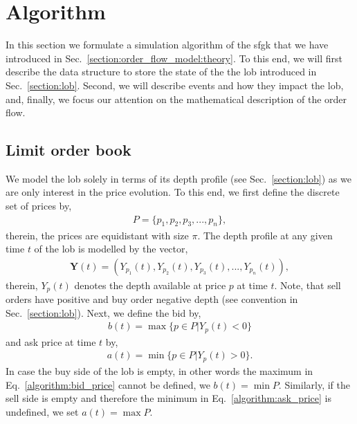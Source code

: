 \documentclass[11pt, a4paper]{thesis}  %
\begin{document}

\section{Algorithm}
\label{section:order_flow_model:algorithm}

In this section we formulate a simulation algorithm of the \ac{sfgk} that we have introduced in Sec.~\ref{section:order_flow_model:theory}. To this end, we will first describe the data structure to store the state of the the \ac{lob} introduced in Sec.~\ref{section:lob}. Second, we will describe events and how they impact the \ac{lob}, and, finally, we focus our attention on the mathematical description of the order flow.

%
%

\subsection{Limit order book}
We model the \ac{lob} solely in terms of its depth profile (see Sec.~\ref{section:lob}) as we are only interest in the price evolution. To this end, we first define the discrete set of prices by,
% 
\begin{eqnarray}
	P=\lbrace p_1, p_2, p_3,..., p_n\rbrace,
\end{eqnarray}
%
therein, the prices are equidistant with size $\pi$.
%
The depth profile at any given time $t$ of the \ac{lob} is modelled by the vector, 
%
\begin{eqnarray}
	\mathbf{Y}(t)=\left(Y_{p_1}(t), Y_{p_2}(t), Y_{p_3}(t), ..., Y_{p_n}(t)\right),
\end{eqnarray} 
%
therein, $Y_p(t)$ denotes the depth available at price $p$ at time $t$. Note, that sell orders have positive and buy order negative depth (see convention in Sec.~\ref{section:lob}). Next, we define the bid by, 
%
\begin{eqnarray}
	b(t) = \max\lbrace p\in P|Y_p(t) < 0 \rbrace
	\label{algorithm:bid_price}
\end{eqnarray}
%
and ask price at time $t$ by,
%
\begin{eqnarray}
	a(t)=\min\lbrace p\in P| Y_p(t) > 0\rbrace.
	\label{algorithm:ask_price}
\end{eqnarray} 
%
In case the buy side of the \ac{lob} is empty, in other words the maximum in Eq.~\ref{algorithm:bid_price} cannot be defined, we $b(t)=\min P$. Similarly, if the sell side is empty and therefore the minimum in Eq.~\ref{algorithm:ask_price} is undefined,  we set $a(t)=\max P$.
\end{document}
